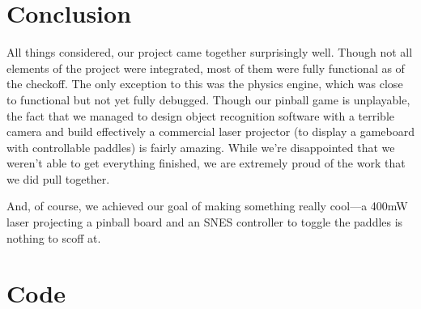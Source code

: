 \documentclass{article}
\begin{document}
\section{Conclusion}
All things considered, our project came together surprisingly well. Though not all elements of the project were integrated, most of them were fully functional as of the checkoff. The only exception to this was the physics engine, which was close to functional but not yet fully debugged. Though our pinball game is unplayable, the fact that we managed to design object recognition software with a terrible camera and build effectively a commercial laser projector (to display a gameboard with controllable paddles) is fairly amazing. While we're disappointed that we weren't able to get everything finished, we are extremely proud of the work that we did pull together.

And, of course, we achieved our goal of making something really cool---a 400mW laser projecting a pinball board and an SNES controller to toggle the paddles is nothing to scoff at.

\pagebreak
\section{Code}
\end{document}
